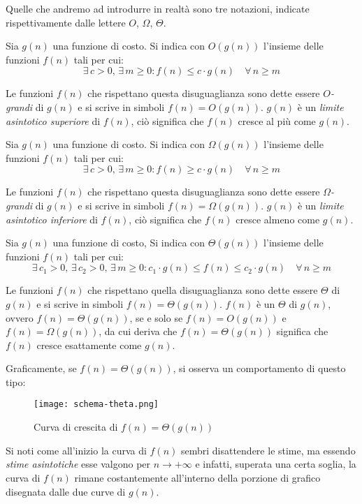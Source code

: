 Quelle che andremo ad introdurre in realtà sono tre notazioni, indicate
rispettivamente dalle lettere $O$, $\Omega$, $\Theta$.

\begin{definition}[Notazione $O$]
    Sia $g(n)$ una funzione di costo. Si indica con $O(g(n))$ l'insieme delle
    funzioni $f(n)$ tali per cui:
    \[\exists\,c>0,\,\exists\,m\geq0:f(n)\leq c\cdot g(n)\quad\forall\,n\geq m\]
\end{definition}\noindent
Le funzioni $f(n)$ che rispettano questa disuguaglianza sono dette essere
\emph{$O$-grandi} di $g(n)$ e si scrive in simboli $f(n)=O(g(n))$. $g(n)$ è un
\emph{limite asintotico superiore} di $f(n)$, ciò significa che $f(n)$ cresce
al più come $g(n)$.\newpage

\begin{definition}
    Sia $g(n)$ una funzione di costo. Si indica con $\Omega(g(n))$ l'insieme
    delle funzioni $f(n)$ tali per cui:
    \[\exists\,c>0,\,\exists\,m\geq0:f(n)\geq c\cdot g(n)\quad\forall\,n\geq m\]
\end{definition}\noindent
Le funzioni $f(n)$ che rispettano questa disuguaglianza sono dette essere
\emph{$\Omega$-grandi} di $g(n)$ e si scrive in simboli $f(n)=\Omega(g(n))$.
$g(n)$ è un \emph{limite asintotico inferiore} di $f(n)$, ciò significa che $f(n)$
cresce almeno come $g(n)$.

\begin{definition}
    Sia $g(n)$ una funzione di costo, Si indica con $\Theta(g(n))$ l'insieme
    delle funzioni $f(n)$ tali per cui: 
    \[\exists\,c_1>0,\,\exists\,c_2>0,\,\exists\,m\geq0:
    c_1\cdot g(n)\leq f(n)\leq c_2\cdot g(n)\quad\forall\,n\geq m\]
\end{definition}\noindent
Le funzioni $f(n)$ che rispettano quella disuguaglianza sono dette essere
$\Theta$ di $g(n)$ e si scrive in simboli $f(n)=\Theta(g(n))$.
$f(n)$ è un $\Theta$ di $g(n)$, ovvero $f(n)=\Theta(g(n))$, se e solo se
$f(n)=O(g(n))$ e $f(n)=\Omega(g(n))$, da cui deriva che $f(n)=\Theta(g(n))$
significa che $f(n)$ cresce esattamente come $g(n)$.

\bigskip\noindent
Graficamente, se $f(n)=\Theta(g(n))$, si osserva un comportamento di questo tipo:

\begin{figure}[htbp]
    \centering
    \texttt{[image: schema-theta.png]}
    \caption{Curva di crescita di $f(n)=\Theta(g(n))$}
\end{figure}\noindent
Si noti come all'inizio la curva di $f(n)$ sembri disattendere le stime, ma
essendo \emph{stime asintotiche} esse valgono per $n\to+\infty$ e infatti,
superata una certa soglia, la curva di $f(n)$ rimane costantemente all'interno
della porzione di grafico disegnata dalle due curve di $g(n)$.

